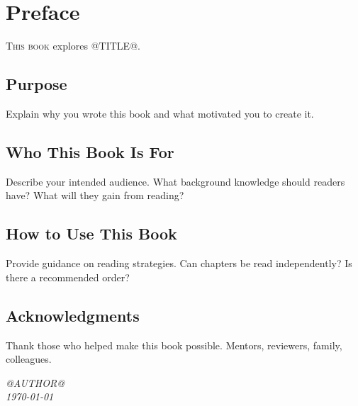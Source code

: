 \chapter*{Preface}

\lettrine{T}{his book} explores @TITLE@.

\section*{Purpose}

Explain why you wrote this book and what motivated you to create it.

\section*{Who This Book Is For}

Describe your intended audience. What background knowledge should readers have? What will they gain from reading?

\section*{How to Use This Book}

Provide guidance on reading strategies. Can chapters be read independently? Is there a recommended order?

\section*{Acknowledgments}

Thank those who helped make this book possible. Mentors, reviewers, family, colleagues.

\vfill
\begin{flushright}
\textit{@AUTHOR@}\\
\textit{\today}
\end{flushright}

\clearpage